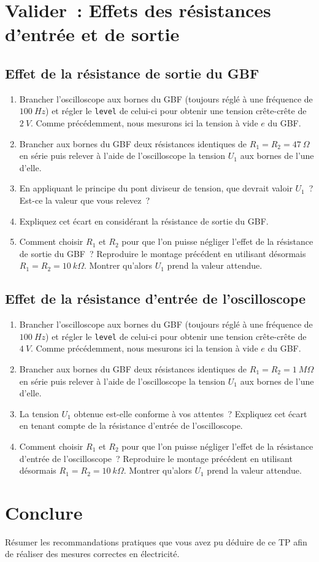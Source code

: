 \documentclass[../main/main.tex]{subfiles}
\begin{document}
\section{Valider~: Effets des résistances d'entrée et de sortie}
\subsection{Effet de la résistance de sortie du GBF}

\begin{enumerate}
	\item Brancher l'oscilloscope aux bornes du GBF (toujours réglé à une
	      fréquence de $\SI{100}{Hz}$) et régler le \texttt{level} de celui-ci
	      pour obtenir une tension crête-crête de $\SI{2}{V}$. Comme précédemment,
	      nous mesurons ici la tension à vide $e$ du GBF.
	\item Brancher aux bornes du GBF deux résistances identiques de $R_1 = R_2 =
		      \SI{47}{\Omega}$ en série puis relever à l'aide de l'oscilloscope la
	      tension $U_1$ aux bornes de l'une d'elle.
	\item En appliquant le principe du pont diviseur de tension, que devrait
	      valoir $U_1$~? Est-ce la valeur que vous relevez~?
	\item Expliquez cet écart en considérant la résistance de sortie du GBF.
	\item Comment choisir $R_1$ et $R_2$ pour que l'on puisse négliger l'effet
	      de la résistance de sortie du GBF~? Reproduire le montage précédent en
	      utilisant désormais $R_1 = R_2 = \SI{10}{k\Omega}$. Montrer qu'alors
	      $U_1$ prend la valeur attendue.
\end{enumerate}

\subsection{Effet de la résistance d'entrée de l'oscilloscope}

\begin{enumerate}
	\item Brancher l'oscilloscope aux bornes du GBF (toujours réglé à une
	      fréquence de $\SI{100}{Hz}$) et régler le \texttt{level} de celui-ci
	      pour obtenir une tension crête-crête de $\SI{4}{V}$. Comme précédemment,
	      nous mesurons ici la tension à vide $e$ du GBF.
	\item Brancher aux bornes du GBF deux résistances identiques de $R_1 = R_2 =
		      \SI{1}{M\Omega}$ en série puis relever à l'aide de l'oscilloscope la
	      tension $U_1$ aux bornes de l'une d'elle.
	\item La tension $U_1$ obtenue est-elle conforme à vos attentes~? Expliquez
	      cet écart en tenant compte de la résistance d'entrée de l'oscilloscope.
	\item Comment choisir $R_1$ et $R_2$ pour que l'on puisse négliger l'effet
	      de la résistance d'entrée de l'oscilloscope~? Reproduire le montage
	      précédent en utilisant désormais $R_1 = R_2 = \SI{10}{k\Omega}$. Montrer
	      qu'alors $U_1$ prend la valeur attendue.
\end{enumerate}

\section{Conclure}

Résumer les recommandations pratiques que vous avez pu déduire de ce TP afin de
réaliser des mesures correctes en électricité.
\end{document}
